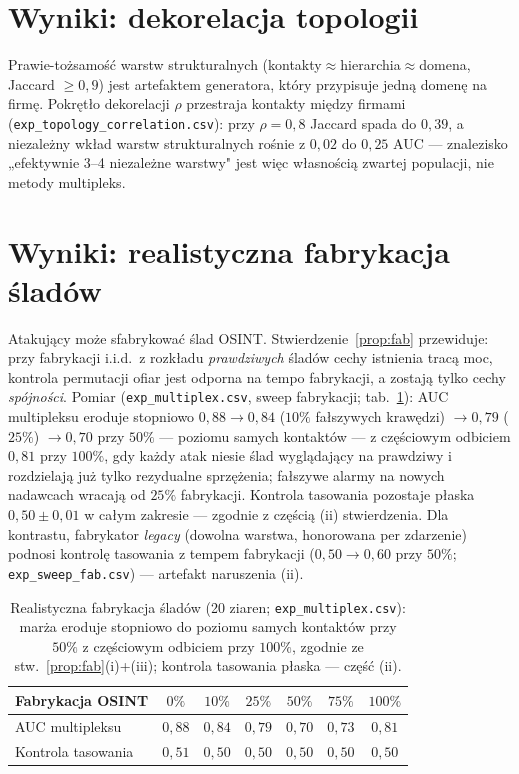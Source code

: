 \section{Wyniki: dekorelacja topologii}
\label{sec:m-topologia}

Prawie-tożsamość warstw strukturalnych
(kontakty$\approx$hierarchia$\approx$domena, Jaccard $\ge0{,}9$)
jest artefaktem generatora, który przypisuje jedną domenę na firmę.
Pokrętło dekorelacji $\rho$ przestraja kontakty między firmami
(\texttt{exp\_topology\_correlation.csv}): przy $\rho=0{,}8$
Jaccard spada do $0{,}39$, a niezależny wkład warstw strukturalnych
rośnie z $0{,}02$ do $0{,}25$ AUC --- znalezisko „efektywnie 3--4
niezależne warstwy" jest więc własnością zwartej populacji, nie
metody multipleks.

\section{Wyniki: realistyczna fabrykacja śladów}
\label{sec:m-fabrykacja}

Atakujący może sfabrykować ślad OSINT. Stwierdzenie~\ref{prop:fab}
przewiduje: przy fabrykacji i.i.d.\ z rozkładu \emph{prawdziwych}
śladów cechy istnienia tracą moc, kontrola permutacji ofiar jest
odporna na tempo fabrykacji, a zostają tylko cechy \emph{spójności}.
Pomiar (\texttt{exp\_multiplex.csv}, sweep fabrykacji;
tab.~\ref{tab:m-fab}): AUC multipleksu eroduje stopniowo
$0{,}88\to0{,}84$ ($10\%$ fałszywych krawędzi) $\to0{,}79$
($25\%$) $\to0{,}70$ przy $50\%$ --- poziomu samych kontaktów ---
z częściowym odbiciem $0{,}81$ przy $100\%$, gdy każdy atak niesie
ślad wyglądający na prawdziwy i rozdzielają już tylko rezydualne
sprzężenia; fałszywe alarmy na nowych nadawcach wracają od
$25\%$ fabrykacji. Kontrola tasowania pozostaje płaska
$0{,}50\pm0{,}01$ w całym zakresie --- zgodnie z częścią (ii)
stwierdzenia. Dla kontrastu, fabrykator \emph{legacy} (dowolna
warstwa, honorowana per zdarzenie) podnosi kontrolę tasowania
z tempem fabrykacji ($0{,}50\to0{,}60$ przy $50\%$;
\texttt{exp\_sweep\_fab.csv}) --- artefakt naruszenia (ii).

\begin{table}[htbp]\centering
\begin{tabular}{lcccccc}
\toprule
Fabrykacja OSINT & $0\%$ & $10\%$ & $25\%$ & $50\%$ & $75\%$ & $100\%$ \\
\midrule
AUC multipleksu   & $0{,}88$ & $0{,}84$ & $0{,}79$ & $0{,}70$ & $0{,}73$ & $0{,}81$ \\
Kontrola tasowania & $0{,}51$ & $0{,}50$ & $0{,}50$ & $0{,}50$ & $0{,}50$ & $0{,}50$ \\
\bottomrule
\end{tabular}
\caption{Realistyczna fabrykacja śladów (20 ziaren;
\texttt{exp\_multiplex.csv}): marża eroduje stopniowo do poziomu
samych kontaktów przy $50\%$ z częściowym odbiciem przy $100\%$,
zgodnie ze stw.~\ref{prop:fab}(i)+(iii); kontrola tasowania płaska
--- część (ii).}
\label{tab:m-fab}
\end{table}

